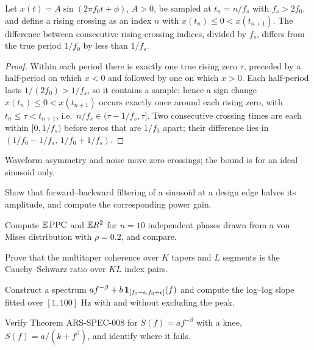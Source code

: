 \begin{theorem}\label{ars:det-002}
Let $x(t)=A\sin(2\pi f_0t+\phi)$, $A>0$, be sampled at $t_n=n/f_s$ with $f_s>2f_0$, and define a rising crossing as an index $n$ with $x(t_n)\le0<x(t_{n+1})$. The difference between consecutive rising-crossing indices, divided by $f_s$, differs from the true period $1/f_0$ by less than $1/f_s$.
\end{theorem}
\begin{proof}
Within each period there is exactly one true rising zero $\tau$, preceded by a half-period on which $x<0$ and followed by one on which $x>0$. Each half-period lasts $1/(2f_0)>1/f_s$, so it contains a sample; hence a sign change $x(t_n)\le0<x(t_{n+1})$ occurs exactly once around each rising zero, with $t_n\le\tau<t_{n+1}$, i.e.\ $n/f_s\in(\tau-1/f_s,\tau]$. Two consecutive crossing times are each within $[0,1/f_s)$ before zeros that are $1/f_0$ apart; their difference lies in $(1/f_0-1/f_s,\,1/f_0+1/f_s)$.
\end{proof}
Waveform asymmetry and noise move zero crossings; the bound is for an ideal sinusoid only.

\begin{exercises}
\item Show that forward--backward filtering of a sinusoid at a design edge halves its amplitude, and compute the corresponding power gain.
\item Compute $\mathbb E\,\mathrm{PPC}$ and $\mathbb E R^2$ for $n=10$ independent phases drawn from a von Mises distribution with $\rho=0.2$, and compare.
\item Prove that the multitaper coherence over $K$ tapers and $L$ segments is the Cauchy--Schwarz ratio over $KL$ index pairs.
\item Construct a spectrum $af^{-\beta}+b\,\mathbf{1}_{[f_0-\epsilon,f_0+\epsilon]}(f)$ and compute the log--log slope fitted over $[1,100]$ Hz with and without excluding the peak.
\item Verify Theorem ARS-SPEC-008 for $S(f)=af^{-\beta}$ with a knee, $S(f)=a/(k+f^\beta)$, and identify where it fails.
\end{exercises}
